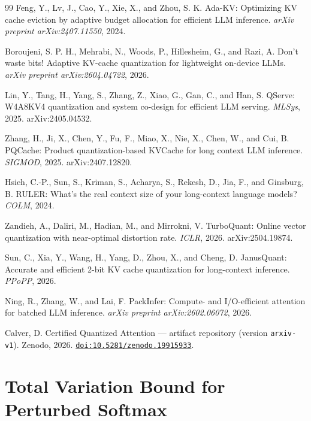\documentclass[10pt,twocolumn,a4paper]{article}
\theoremstyle{definition}
\theoremstyle{remark}
\begin{document}
\begin{thebibliography}{99}
Feng, Y., Lv, J., Cao, Y., Xie, X., and Zhou, S. K.
\newblock Ada-KV: Optimizing KV cache eviction by adaptive budget allocation for efficient LLM inference.
\newblock \emph{arXiv preprint arXiv:2407.11550}, 2024.

Boroujeni, S. P. H., Mehrabi, N., Woods, P., Hillesheim, G., and Razi, A.
\newblock Don't waste bits! Adaptive KV-cache quantization for lightweight on-device LLMs.
\newblock \emph{arXiv preprint arXiv:2604.04722}, 2026.

Lin, Y., Tang, H., Yang, S., Zhang, Z., Xiao, G., Gan, C., and Han, S.
\newblock QServe: W4A8KV4 quantization and system co-design for efficient LLM serving.
\newblock \emph{MLSys}, 2025.
\newblock arXiv:2405.04532.

Zhang, H., Ji, X., Chen, Y., Fu, F., Miao, X., Nie, X., Chen, W., and Cui, B.
\newblock PQCache: Product quantization-based KVCache for long context LLM inference.
\newblock \emph{SIGMOD}, 2025.
\newblock arXiv:2407.12820.

Hsieh, C.-P., Sun, S., Kriman, S., Acharya, S., Rekesh, D., Jia, F., and Ginsburg, B.
\newblock RULER: What's the real context size of your long-context language models?
\newblock \emph{COLM}, 2024.

Zandieh, A., Daliri, M., Hadian, M., and Mirrokni, V.
\newblock TurboQuant: Online vector quantization with near-optimal distortion rate.
\newblock \emph{ICLR}, 2026.
\newblock arXiv:2504.19874.

Sun, C., Xia, Y., Wang, H., Yang, D., Zhou, X., and Cheng, D.
\newblock JanusQuant: Accurate and efficient 2-bit KV cache quantization for long-context inference.
\newblock \emph{PPoPP}, 2026.

Ning, R., Zhang, W., and Lai, F.
\newblock PackInfer: Compute- and I/O-efficient attention for batched LLM inference.
\newblock \emph{arXiv preprint arXiv:2602.06072}, 2026.

Calver, D.
\newblock Certified Quantized Attention --- artifact repository (version \texttt{arxiv-v1}).
\newblock Zenodo, 2026.
\newblock \href{https://doi.org/10.5281/zenodo.19915933}{\texttt{doi:10.5281/zenodo.19915933}}.

\end{thebibliography}

\appendix
\section{Total Variation Bound for Perturbed Softmax}
\label{app:tv_proof}
\end{document}
